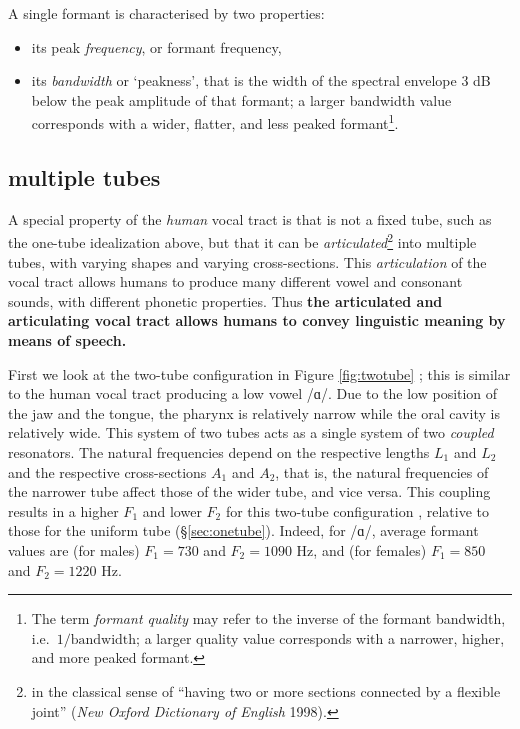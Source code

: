 \documentclass[
]{book}
\begin{document}
A single formant is characterised by two properties:

\begin{itemize}
\item
  its peak \emph{frequency}, or formant frequency,
\item
  its \emph{bandwidth} or `peakness', that is the width of the spectral envelope \(3\) dB below the peak amplitude of that formant; a larger bandwidth value corresponds with a wider, flatter, and less peaked formant\footnote{The term \emph{formant quality} may refer to the inverse of the formant bandwidth, i.e.~\(1/\textrm{bandwidth}\); a larger quality value corresponds with a narrower, higher, and more peaked formant.}.
\end{itemize}

\subsection{multiple tubes}\label{sec:moretubes}

A special property of the \emph{human} vocal tract is that is not a fixed tube, such as the one-tube idealization above, but that it can be \emph{articulated}\footnote{in the classical sense of ``having two or more sections connected by a flexible joint'' (\emph{New Oxford Dictionary of English} 1998).} into multiple tubes, with varying shapes and varying cross-sections. This \emph{articulation} of the vocal tract allows humans to produce many different vowel and consonant sounds, with different phonetic properties. Thus \textbf{the articulated and articulating vocal tract allows humans to convey linguistic meaning by means of speech.}

First we look at the two-tube configuration in Figure \ref{fig:twotube} \citep[after][Fig.3.13, p.143]{Stevens_1998}; this is similar to the human vocal tract producing a low vowel /ɑ/. Due to the low position of the jaw and the tongue, the pharynx is relatively narrow while the oral cavity is relatively wide. This system of two tubes acts as a single system of two \emph{coupled} resonators. The natural frequencies depend on the respective lengths \(L_1\) and \(L_2\) and the respective cross-sections \(A_1\) and \(A_2\), that is, the natural frequencies of the narrower tube affect those of the wider tube, and vice versa. This coupling results in a higher \(F_1\) and lower \(F_2\) for this two-tube configuration \citep[Fig.3.14]{Stevens_1998}, relative to those for the uniform tube (§\ref{sec:onetube}). Indeed, for /ɑ/, average formant values are (for males) \(F_1=730\) and \(F_2=1090\) Hz, and (for females) \(F_1=850\) and \(F_2=1220\) Hz.
\end{document}
